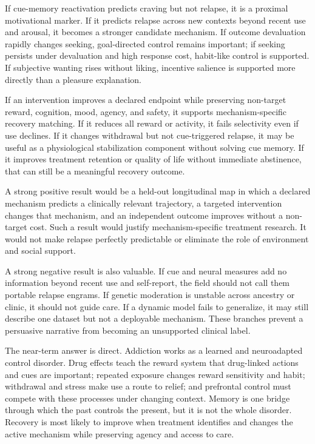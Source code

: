 \documentclass[conference]{IEEEtran}
\begin{document}
If cue-memory reactivation predicts craving but not relapse, it is a proximal motivational marker. If it predicts relapse across new contexts beyond recent use and arousal, it becomes a stronger candidate mechanism. If outcome devaluation rapidly changes seeking, goal-directed control remains important; if seeking persists under devaluation and high response cost, habit-like control is supported. If subjective wanting rises without liking, incentive salience is supported more directly than a pleasure explanation.

If an intervention improves a declared endpoint while preserving non-target reward, cognition, mood, agency, and safety, it supports mechanism-specific recovery matching. If it reduces all reward or activity, it fails selectivity even if use declines. If it changes withdrawal but not cue-triggered relapse, it may be useful as a physiological stabilization component without solving cue memory. If it improves treatment retention or quality of life without immediate abstinence, that can still be a meaningful recovery outcome.

A strong positive result would be a held-out longitudinal map in which a declared mechanism predicts a clinically relevant trajectory, a targeted intervention changes that mechanism, and an independent outcome improves without a non-target cost. Such a result would justify mechanism-specific treatment research. It would not make relapse perfectly predictable or eliminate the role of environment and social support.

A strong negative result is also valuable. If cue and neural measures add no information beyond recent use and self-report, the field should not call them portable relapse engrams. If genetic moderation is unstable across ancestry or clinic, it should not guide care. If a dynamic model fails to generalize, it may still describe one dataset but not a deployable mechanism. These branches prevent a persuasive narrative from becoming an unsupported clinical label.

The near-term answer is direct. Addiction works as a learned and neuroadapted control disorder. Drug effects teach the reward system that drug-linked actions and cues are important; repeated exposure changes reward sensitivity and habit; withdrawal and stress make use a route to relief; and prefrontal control must compete with these processes under changing context. Memory is one bridge through which the past controls the present, but it is not the whole disorder. Recovery is most likely to improve when treatment identifies and changes the active mechanism while preserving agency and access to care.
\end{document}
